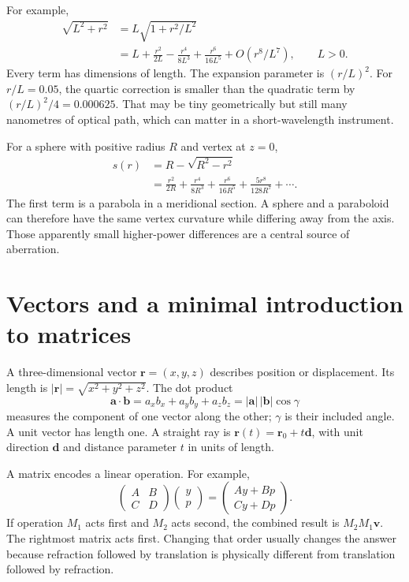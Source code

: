 For example,
\begin{align}
\sqrt{L^2+r^2}
&=L\sqrt{1+r^2/L^2}\\
&=L+\frac{r^2}{2L}-\frac{r^4}{8L^3}
+\frac{r^6}{16L^5}+O(r^8/L^7),\qquad L>0.
\label{fnd:distance-series}
\end{align}
Every term has dimensions of length. The expansion parameter is $(r/L)^2$. For $r/L=0.05$, the quartic correction is smaller than the quadratic term by $(r/L)^2/4=0.000625$. That may be tiny geometrically but still many nanometres of optical path, which can matter in a short-wavelength instrument.

For a sphere with positive radius $R$ and vertex at $z=0$,
\begin{align}
s(r)&=R-\sqrt{R^2-r^2}\\
&=\frac{r^2}{2R}+\frac{r^4}{8R^3}
+\frac{r^6}{16R^5}+\frac{5r^8}{128R^7}+\cdots.
\label{fnd:sphere-sag}
\end{align}
The first term is a parabola in a meridional section. A sphere and a paraboloid can therefore have the same vertex curvature while differing away from the axis. Those apparently small higher-power differences are a central source of aberration.

\section{Vectors and a minimal introduction to matrices}
A three-dimensional vector $\bm{r}=(x,y,z)$ describes position or displacement. Its length is $|\bm{r}|=\sqrt{x^2+y^2+z^2}$. The dot product
\[
\bm{a}\cdot\bm{b}=a_xb_x+a_yb_y+a_zb_z
=|\bm{a}|\,|\bm{b}|\cos\gamma
\]
measures the component of one vector along the other; $\gamma$ is their included angle. A unit vector has length one. A straight ray is $\bm{r}(t)=\bm{r}_0+t\bm{d}$, with unit direction $\bm{d}$ and distance parameter $t$ in units of length.

A matrix encodes a linear operation. For example,
\[
\begin{pmatrix}A&B\\C&D\end{pmatrix}
\begin{pmatrix}y\\p\end{pmatrix}
=\begin{pmatrix}Ay+Bp\\Cy+Dp\end{pmatrix}.
\]
If operation $M_1$ acts first and $M_2$ acts second, the combined result is $M_2M_1\bm{v}$. The rightmost matrix acts first. Changing that order usually changes the answer because refraction followed by translation is physically different from translation followed by refraction.

